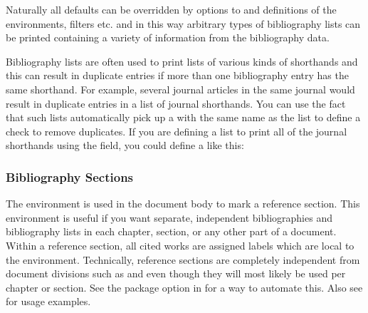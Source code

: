\documentclass{ltxdockit}[2011/03/25]
\begin{document}
\begin{ltxsyntax}
\begin{ltxexample}
\end{ltxexample}

Naturally all defaults can be overridden by options to  and definitions of the environments, filters etc. and in this way arbitrary types of bibliography lists can be printed containing a variety of information from the bibliography data.
\end{ltxsyntax}

Bibliography lists are often used to print lists of various kinds of shorthands and this can result in duplicate entries if more than one bibliography entry has the same shorthand. For example, several journal articles in the same journal would result in duplicate entries in a list of journal shorthands. You can use the fact that such lists automatically pick up a  with the same name as the list to define a check to remove duplicates. If you are defining a list to print all of the journal shorthands using the  field, you could define a  like this:

\begin{ltxexample}
\end{ltxexample}

\subsubsection{Bibliography Sections}
\label{use:bib:sec}

The  environment is used in the document body to mark a reference section. This environment is useful if you want separate, independent bibliographies and bibliography lists in each chapter, section, or any other part of a document. Within a reference section, all cited works are assigned labels which are local to the environment. Technically, reference sections are completely independent from document divisions such as  and  even though they will most likely be used per chapter or section. See the  package option in  for a way to automate this. Also see  for usage examples.
\end{document}
